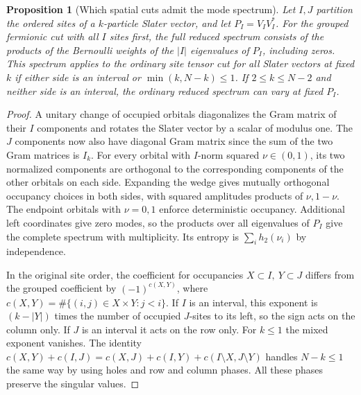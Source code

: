 \documentclass[11pt,reqno]{amsart}
\newtheorem{proposition}[theorem]{Proposition}
\theoremstyle{definition}
\theoremstyle{remark}
\numberwithin{equation}{section}
\begin{document}
\begin{proposition}[Which spatial cuts admit the mode spectrum]\label{m9:slater}
Let \(I,J\) partition the ordered sites of a \(k\)-particle Slater
vector, and let \(P_I=V_I V_I^*\). For the grouped fermionic cut
with all \(I\) sites first, the full reduced spectrum consists
of the products of the Bernoulli weights of the \(|I|\) eigenvalues
of \(P_I\), including zeros. This spectrum applies to the ordinary
site tensor cut for all Slater vectors at fixed \(k\) if either
side is an interval or \(\min(k,N-k)\le1\).
If \(2\le k\le N-2\) and neither side is an interval,
the ordinary reduced spectrum can vary at fixed \(P_I\).
\end{proposition}
\begin{proof}
A unitary change of occupied orbitals diagonalizes the Gram matrix
of their \(I\) components and rotates the Slater vector by a scalar
of modulus one. The \(J\) components now also have diagonal Gram
matrix since the sum of the two Gram matrices is \(I_k\).
For every orbital with \(I\)-norm squared \(\nu\in(0,1)\),
its two normalized components are orthogonal to the corresponding
components of the other orbitals on each side. Expanding the
wedge gives mutually orthogonal occupancy choices in both sides,
with squared amplitudes products of \(\nu,1-\nu\). The endpoint
orbitals with \(\nu=0,1\) enforce deterministic occupancy.
Additional left coordinates give zero modes, so the products over
all eigenvalues of \(P_I\) give the complete spectrum with
multiplicity. Its entropy is \(\sum_i h_2(\nu_i)\) by independence.

In the original site order, the coefficient for occupancies
\(X\subset I,\ Y\subset J\) differs from the grouped coefficient
by \((-1)^{c(X,Y)}\), where \(c(X,Y)=\#\{(i,j)\in X\times Y:j<i\}\).
If \(I\) is an interval, this exponent is
\((k-|Y|)\) times the number of occupied \(J\)-sites to its left,
so the sign acts on the column only. If \(J\) is an interval it
acts on the row only. For \(k\le1\) the mixed exponent vanishes.
The identity
\(c(X,Y)+c(I,J)=c(X,J)+c(I,Y)+c(I\setminus X,J\setminus Y)\)
handles \(N-k\le1\) the same way by using holes and row and column
phases. All these phases preserve the singular values.


\end{proof}
\end{document}
